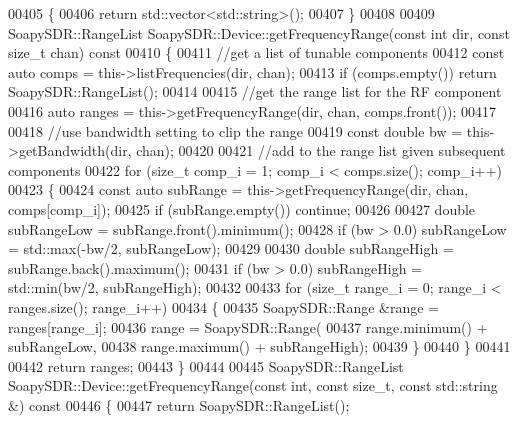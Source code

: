\begin{DoxyCode}
00405 \textcolor{keyword}{}\{
00406     \textcolor{keywordflow}{return} std::vector<std::string>();
00407 \}
00408 
00409 SoapySDR::RangeList SoapySDR::Device::getFrequencyRange(\textcolor{keyword}{const} \textcolor{keywordtype}{int} dir, \textcolor{keyword}{const} \textcolor{keywordtype}{size\_t} 
      chan)\textcolor{keyword}{ const}
00410 \textcolor{keyword}{}\{
00411     \textcolor{comment}{//get a list of tunable components}
00412     \textcolor{keyword}{const} \textcolor{keyword}{auto} comps = this->listFrequencies(dir, chan);
00413     \textcolor{keywordflow}{if} (comps.empty()) \textcolor{keywordflow}{return} SoapySDR::RangeList();
00414 
00415     \textcolor{comment}{//get the range list for the RF component}
00416     \textcolor{keyword}{auto} ranges = this->getFrequencyRange(dir, chan, comps.front());
00417 
00418     \textcolor{comment}{//use bandwidth setting to clip the range}
00419     \textcolor{keyword}{const} \textcolor{keywordtype}{double} bw = this->getBandwidth(dir, chan);
00420 
00421     \textcolor{comment}{//add to the range list given subsequent components}
00422     \textcolor{keywordflow}{for} (\textcolor{keywordtype}{size\_t} comp\_i = 1; comp\_i < comps.size(); comp\_i++)
00423     \{
00424         \textcolor{keyword}{const} \textcolor{keyword}{auto} subRange = this->getFrequencyRange(dir, chan, comps[comp\_i]);
00425         \textcolor{keywordflow}{if} (subRange.empty()) \textcolor{keywordflow}{continue};
00426 
00427         \textcolor{keywordtype}{double} subRangeLow = subRange.front().minimum();
00428         \textcolor{keywordflow}{if} (bw > 0.0) subRangeLow = std::max(-bw/2, subRangeLow);
00429 
00430         \textcolor{keywordtype}{double} subRangeHigh = subRange.back().maximum();
00431         \textcolor{keywordflow}{if} (bw > 0.0) subRangeHigh = std::min(bw/2, subRangeHigh);
00432 
00433         \textcolor{keywordflow}{for} (\textcolor{keywordtype}{size\_t} range\_i = 0; range\_i < ranges.size(); range\_i++)
00434         \{
00435             SoapySDR::Range &range = ranges[range\_i];
00436             range = SoapySDR::Range(
00437                 range.minimum() + subRangeLow,
00438                 range.maximum() + subRangeHigh);
00439         \}
00440     \}
00441 
00442     \textcolor{keywordflow}{return} ranges;
00443 \}
00444 
00445 SoapySDR::RangeList SoapySDR::Device::getFrequencyRange(\textcolor{keyword}{const} \textcolor{keywordtype}{int}, \textcolor{keyword}{const} \textcolor{keywordtype}{size\_t}, \textcolor{keyword}{const} 
      std::string &)\textcolor{keyword}{ const}
00446 \textcolor{keyword}{}\{
00447     \textcolor{keywordflow}{return} SoapySDR::RangeList();

\end{DoxyCode}
